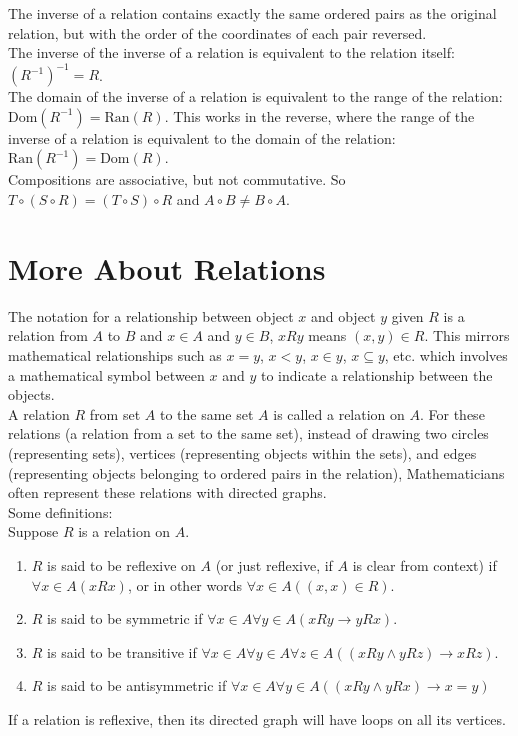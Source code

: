 \documentclass{article}
\begin{document}
\noindent The inverse of a relation contains exactly the same ordered pairs as the original relation, but with the order of the coordinates of each pair reversed.\\

\noindent The inverse of the inverse of a relation is equivalent to the relation itself: $(R^{-1})^{-1} = R$.\\ 

\noindent The domain of the inverse of a relation is equivalent to the range of the relation: $\text{Dom}(R^{-1}) = \text{Ran}(R)$. This works in the reverse, where the range of the inverse of a relation is equivalent to the domain of the relation: $\text{Ran}(R^{-1}) = \text{Dom}(R)$.\\

\noindent Compositions are associative, but not commutative. So $T \circ (S \circ R)= (T \circ S) \circ R$ and $A \circ B \neq B \circ A$.

\section{More About Relations}
The notation for a relationship between object $x$ and object $y$ given $R$ is a relation from $A$ to $B$ and $x \in A$ and $y \in B$, $xRy$ means $(x,y) \in R$. This mirrors mathematical relationships such as $x = y$, $x < y$, $x \in y$, $x \subseteq y$, etc. which involves a mathematical symbol between $x$ and $y$ to indicate a relationship between the objects.\\

\noindent A relation $R$ from set $A$ to the same set $A$ is called a \gls{relation on} $A$. For these relations (a relation from a set to the same set), instead of drawing two circles (representing sets), vertices (representing objects within the sets), and edges (representing objects belonging to ordered pairs in the relation), Mathematicians often represent these relations with \glspl{directed graph}.\\

\noindent Some definitions:\\
Suppose $R$ is a relation on $A$.
\begin{enumerate}
    \item $R$ is said to be \gls{reflexive} on $A$ (or just reflexive, if $A$ is clear from context) if $\forall x \in A(xRx)$, or in other words $\forall x \in A((x,x) \in R)$.
    \item $R$ is said to be \gls{symmetric} if $\forall x \in A \forall y \in A(xRy \rightarrow yRx)$.
    \item $R$ is said to be \gls{transitive} if $\forall x \in A \forall y \in A \forall z \in A((xRy \land yRz) \rightarrow xRz)$.
    \item $R$ is said to be \gls{antisymmetric} if $\forall x \in A \forall y \in A((xRy \land yRx) \rightarrow x = y)$
\end{enumerate}
If a relation is reflexive, then its directed graph will have \glspl{loop} on all its vertices.\\
\end{document}
